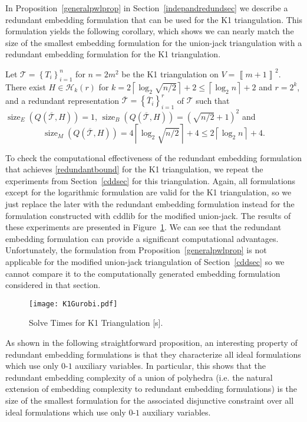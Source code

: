 \documentclass[mnsc]{informs3}
\newcommand{\set}[1]{\left\{#1\right\}}                     %
\newcommand{\bra}[1]{\left(#1\right)}
\newcommand{\sidx}[1]{\left\llbracket     #1 \right\rrbracket}
\DeclareMathOperator{\size}{size}
\begin{document}
In Proposition~\ref{generalpwlprop} in Section~\ref{indepandredundsec}  we describe a redundant embedding formulation that can be used for the K1 triangulation. This formulation yields the following corollary, which shows we can nearly match the size of the smallest embedding formulation for the union-jack triangulation with a redundant embedding formulation for the K1 triangulation. 
\begin{corollary}\label{tiangcoro}Let $\mathcal{T}=\set{T_i}_{i=1}^n$ for $n=2 m^2$ be the K1 triangulation on $V=\sidx{m+1}^2$.  There exist $H\in \mathcal{H}_{k}(r)$ for $k=2 \left\lceil \log_2 \sqrt{n/2}\right\rceil+ 2\leq   \left\lceil \log_2 n\right\rceil+2$ and $r=2^k$, and a redundant representation $\overline{\mathcal{T}}=\set{\overline{T}_i}_{i=1}^r$ of $\mathcal{T}$ such that $\size_E\bra{Q\bra{\overline{\mathcal{T}},H}}=1$, $\size_B\bra{Q\bra{\overline{\mathcal{T}},H}}=\bra{\sqrt{n/2}+1}^2$ and 
\begin{equation}\label{redundantbound}
\size_M\bra{Q\bra{\overline{\mathcal{T}},H}} = 4 \left\lceil \log_2 \sqrt{n/2}\right\rceil+ 4\leq  2 \left\lceil \log_2 n\right\rceil+4.
\end{equation}
\end{corollary}
To check the computational effectiveness of the redundant embedding formulation that achieves \eqref{redundantbound} for the K1 triangulation, we repeat the experiments from Section~\ref{cddsec} for this triangulation. Again, all formulations except for the logarithmic formulation are valid for the K1 triangulation, so we just replace the later with the redundant embedding formulation instead for the formulation constructed with cddlib for the modified union-jack. The results of these experiments are presented in Figure~\ref{resfig2}. We can see that the redundant embedding formulation can provide a significant computational advantages. Unfortunately,  the formulation from Proposition~\ref{generalpwlprop} is not applicable for the modified union-jack triangulation of Section~\ref{cddsec} so we cannot compare it to the computationally generated embedding formulation considered in that section.
\begin{figure}[htpb]
    \begin{center}
  \texttt{[image: K1Gurobi.pdf]}
  \end{center}
  \caption{Solve Times for K1 Triangulation [s].}\label{resfig2}
  \end{figure}

As shown in the following straightforward proposition, an interesting property of redundant embedding formulations is that they characterize all ideal formulations which use only $0$-$1$ auxiliary variables. In particular, this shows that the redundant embedding complexity of a union of polyhedra (i.e. the natural extension of embedding complexity to redundant embedding formulations) is the size of the smallest formulation for the associated disjunctive constraint over all ideal formulations which use only $0$-$1$ auxiliary variables.
\end{document}
